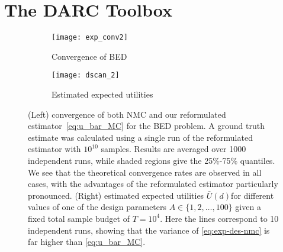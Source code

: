 
\section{The DARC Toolbox}
\label{sec:design:darc}

\begin{figure}[t]
	\centering
	\begin{subfigure}[b]{0.49\textwidth}
		\centering
		\texttt{[image: exp\_conv2]}
		\caption{Convergence of BED\label{fig:exp-conv}}
	\end{subfigure}
		\begin{subfigure}[b]{0.49\textwidth}
			\centering
			\texttt{[image: dscan\_2]}
			\caption{Estimated expected utilities \label{fig:exp-d-scan}}
		\end{subfigure}
	\caption{(Left) convergence of both NMC and our reformulated
		estimator~\eqref{eq:u_bar_MC} for the BED problem.
		A ground truth estimate was calculated using a single run of the reformulated
		estimator with $10^{10}$ samples.
		Results are averaged over 1000 independent runs, while shaded regions give the 25\%-75\% quantiles. We
		see that the theoretical convergence rates are observed in all cases,
		with the advantages of the reformulated estimator particularly pronounced.
		(Right) estimated expected utilities $\bar{U}(d)$for 
		different values of one of the design parameters $A \in \{1,2,\dots,100\}$ given a fixed total
		sample budget of $T=10^4$.  Here the lines correspond to 10 independent runs, showing
		that the variance of \eqref{eq:exp-des-nmc} is far higher than \eqref{eq:u_bar_MC}.
		}
\end{figure}

